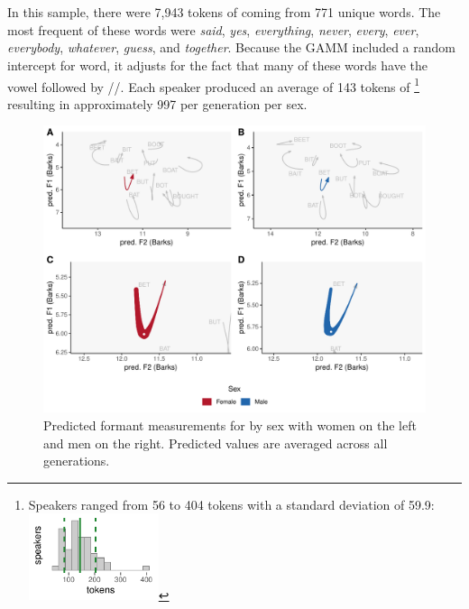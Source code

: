 \section{\bet}
\label{BET}

In this sample, there were 7,943 tokens of \bet coming from 771 unique words. The most frequent of these words were \textit{said}, \textit{yes}, \textit{everything}, \textit{never}, \textit{every}, \textit{ever}, \textit{everybody}, \textit{whatever}, \textit{guess}, and \textit{together}. Because the GAMM included a random intercept for word, it adjusts for the fact that many of these words have the vowel followed by //. Each speaker produced an average of 143 tokens of \bet\footnote{Speakers ranged from 56 to 404 tokens with a standard deviation of 59.9: \includegraphics[width = 1.5in]{Figures/BET/BET_tiny.pdf}} resulting in approximately 997 per generation per sex.

\begin{figure}[tb!]
	\centering
	\includegraphics[width = 6.5in]{Figures/BET/BET_four_panel_plot_summarized.pdf}
	\caption[Predicted formant measurements for \bet by sex.]{Predicted formant measurements for \bet by sex with women on the left and men on the right. Predicted values are averaged across all generations.}
	\label{fig:BET_four_panel_summarized}
\end{figure}


